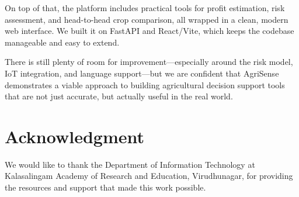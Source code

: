 \documentclass[conference]{IEEEtran}
\begin{document}
On top of that, the platform includes practical tools for profit estimation, risk assessment, and head-to-head crop comparison, all wrapped in a clean, modern web interface. We built it on FastAPI and React/Vite, which keeps the codebase manageable and easy to extend.

There is still plenty of room for improvement---especially around the risk model, IoT integration, and language support---but we are confident that AgriSense demonstrates a viable approach to building agricultural decision support tools that are not just accurate, but actually useful in the real world.

\section*{Acknowledgment}
We would like to thank the Department of Information Technology at Kalasalingam Academy of Research and Education, Virudhunagar, for providing the resources and support that made this work possible.
\end{document}
